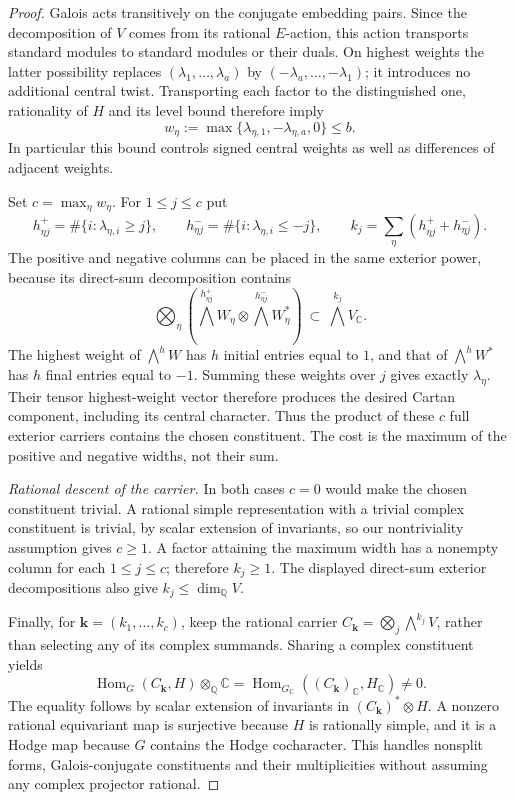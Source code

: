 \documentclass[11pt]{amsart}
\newcommand{\Q}{\mathbb Q}
\newcommand{\C}{\mathbb C}
\DeclareMathOperator{\Hom}{Hom}
\theoremstyle{definition}
\theoremstyle{remark}
\numberwithin{equation}{section}
\begin{document}
\begin{proof}
Galois acts transitively on the conjugate embedding pairs.  Since
the decomposition of $V$ comes from its rational $E$-action, this
action transports standard modules to standard modules or their
duals.  On highest weights the latter possibility replaces
$(\lambda_1,\ldots,\lambda_a)$ by
$(-\lambda_a,\ldots,-\lambda_1)$; it introduces no additional
central twist.  Transporting each factor to the distinguished
one, rationality of $H$ and its level bound therefore imply
\[
 w_\eta:=\max\{\lambda_{\eta,1},
                  -\lambda_{\eta,a},0\}\le b.
\]
In particular this bound controls signed central weights as well
as differences of adjacent weights.

Set $c=\max_\eta w_\eta$.  For $1\le j\le c$ put
\[
 h^+_{\eta j}=\#\{i:\lambda_{\eta,i}\ge j\},\qquad
 h^-_{\eta j}=\#\{i:\lambda_{\eta,i}\le-j\},\qquad
 k_j=\sum_\eta(h^+_{\eta j}+h^-_{\eta j}).
\]
The positive and negative columns can be placed in the same
exterior power, because its direct-sum decomposition contains
\[
 \bigotimes_\eta
 \left(\bigwedge^{h^+_{\eta j}}W_\eta
       \otimes\bigwedge^{h^-_{\eta j}}W_\eta^*\right)
       \ \subset\ \bigwedge^{k_j}V_\C.
\]
The highest weight of $\bigwedge^h W$ has $h$ initial entries
equal to $1$, and that of $\bigwedge^h W^*$ has $h$ final entries
equal to $-1$.  Summing these weights over $j$ gives exactly
$\lambda_\eta$.  Their tensor highest-weight vector therefore
produces the desired Cartan component, including its central
character.  Thus the product of these $c$ full exterior carriers
contains the chosen constituent.  The cost is the maximum of
the positive and negative widths, not their sum.

\emph{Rational descent of the carrier.}
In both cases $c=0$ would make the chosen constituent trivial.
A rational simple representation with a trivial complex
constituent is trivial, by scalar extension of invariants, so
our nontriviality assumption gives $c\ge1$.  A factor attaining
the maximum width has a nonempty column for each $1\le j\le c$;
therefore $k_j\ge1$.  The displayed direct-sum exterior
decompositions also give $k_j\le\dim_\Q V$.

Finally, for $\mathbf k=(k_1,\ldots,k_c)$, keep the rational carrier
$C_{\mathbf k}=\bigotimes_j\bigwedge^{k_j}V$, rather than selecting any
of its complex summands.  Sharing a complex constituent yields
\[
 \Hom_G(C_{\mathbf k},H)\otimes_\Q\C
       =\Hom_{G_\C}((C_{\mathbf k})_\C,H_\C)\ne0.
\]
The equality follows by scalar extension of invariants in
$(C_{\mathbf k})^*\otimes H$.  A nonzero rational equivariant map is
surjective because $H$ is rationally simple, and it is a Hodge
map because $G$ contains the Hodge cocharacter.  This handles
nonsplit forms, Galois-conjugate constituents and their
multiplicities without assuming any complex projector rational.
\end{proof}
\end{document}
